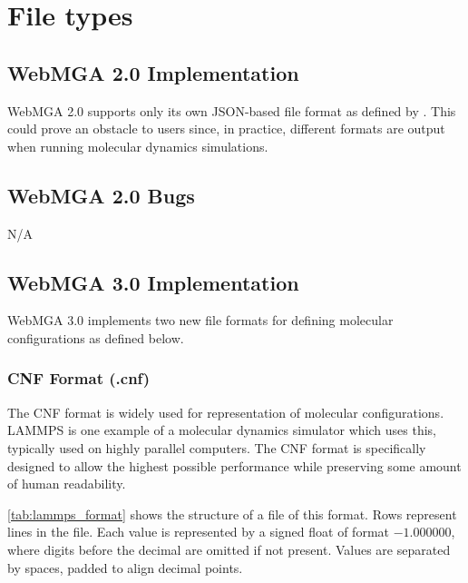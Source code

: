 \section{File types}
\subsection{WebMGA 2.0 Implementation}
WebMGA 2.0 supports only its own JSON-based file format as defined by \citeauthor{Battistini_2021}. This could prove an obstacle to users since, in practice, different formats are output when running molecular dynamics simulations.

\subsection{WebMGA 2.0 Bugs}
N/A

\subsection{WebMGA 3.0 Implementation}
WebMGA 3.0 implements two new file formats for defining molecular configurations as defined below.
\subsubsection{CNF Format (.cnf)}
The CNF format is widely used for representation of molecular configurations. LAMMPS is one example of a molecular dynamics simulator which uses this, typically used on highly parallel computers\cite{thompson2022lammps}. The CNF format is specifically designed to allow the highest possible performance while preserving some amount of human readability.

\cref{tab:lammps_format} shows the structure of a file of this format. Rows represent lines in the file. Each value is represented by a signed float of format $-1.000000 $, where digits before the decimal are omitted if not present. Values are separated by spaces, padded to align decimal points.

